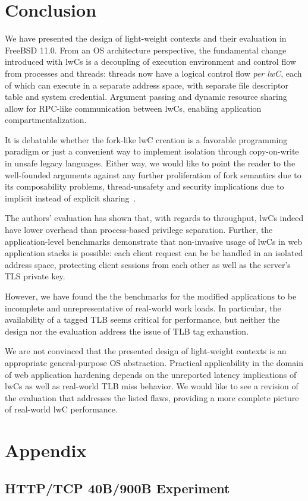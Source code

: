 \documentclass[10pt,twocolumn,a4paper]{article}
\begin{document}
\section{Conclusion}\label{conclusion}
We have presented the design of light-weight contexts and their evaluation in FreeBSD 11.0.
From an OS architecture perspective, the fundamental change introduced with lwCs is a decoupling of execution environment and control flow from processes and threads:
threads now have a logical control flow \textit{per lwC}, each of which can execute in a separate address space, with separate file descriptor table and system credential.
Argument passing and dynamic resource sharing allow for RPC-like communication between lwCs, enabling application compartmentalization.

It is debatable whether the fork-like lwC creation is a favorable programming paradigm or just a convenient way to implement isolation through copy-on-write in unsafe legacy languages.
Either way, we would like to point the reader to the well-founded arguments against any further proliferation of fork semantics due to its composability problems, thread-unsafety and security implications due to implicit instead of explicit sharing~\cite{baumann2019a}.

The authors' evaluation has shown that, with regards to throughput, lwCs indeed have lower overhead than process-based privilege separation.
Further, the application-level benchmarks demonstrate that non-invasive usage of lwCs in web application stacks is possible:
each client request can be be handled in an isolated address space, protecting client sessions from each other as well as the server's TLS private key.

However, we have found the the benchmarks for the modified applications to be incomplete and unrepresentative of real-world work loads.
In particular, the availability of a tagged TLB seems critical for performance, but neither the design nor the evaluation address the issue of TLB tag exhaustion.

We are not convinced that the presented design of light-weight contexts is an appropriate general-purpose OS abstraction.
Practical applicability in the domain of web application hardening depends on the unreported latency implications of lwCs as well as real-world TLB miss behavior.
We would like to see a revision of the evaluation that addresses the listed flaws, providing a more complete picture of real-world lwC performance.

\onecolumn
\section{Appendix}

\subsection{HTTP/TCP 40B/900B Experiment}\label{appendix:httppayloads}



\twocolumn
\nocite{*}
\clearpage
\printbibliography
\end{document}
